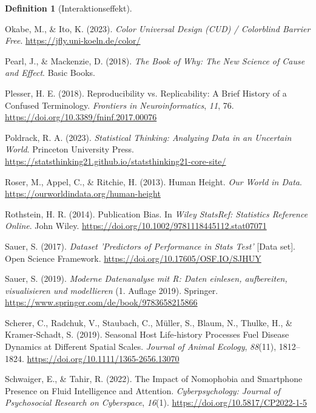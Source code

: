 \documentclass[
  letterpaper,
]{scrbook}
\newlength{\cslhangindent}
\newenvironment{CSLReferences}[2] %
 {\begin{list}{}{%
  \setlength{\itemindent}{0pt}
  \setlength{\leftmargin}{0pt}
  \setlength{\parsep}{0pt}
  \ifodd #1
   \setlength{\leftmargin}{\cslhangindent}
   \setlength{\itemindent}{-1\cslhangindent}
  \fi
  \setlength{\itemsep}{#2\baselineskip}}}
 {\end{list}}
\theoremstyle{definition}
\theoremstyle{definition}
\theoremstyle{definition}
\newtheorem{definition}{Definition}[chapter]
\theoremstyle{remark}
\begin{document}
\begin{definition}[Interaktionseffekt]
\begin{CSLReferences}{1}{0}
Okabe, M., \& Ito, K. (2023). \emph{Color {Universal Design} ({CUD}) /
{Colorblind Barrier Free}}. \url{https://jfly.uni-koeln.de/color/}

Pearl, J., \& Mackenzie, D. (2018). \emph{The Book of Why: The New
Science of Cause and Effect}. Basic Books.

Plesser, H. E. (2018). Reproducibility vs. {Replicability}: {A Brief
History} of a {Confused Terminology}. \emph{Frontiers in
Neuroinformatics}, \emph{11}, 76.
\url{https://doi.org/10.3389/fninf.2017.00076}

Poldrack, R. A. (2023). \emph{Statistical Thinking: Analyzing Data in an
Uncertain World}. Princeton University Press.
\url{https://statsthinking21.github.io/statsthinking21-core-site/}

Roser, M., Appel, C., \& Ritchie, H. (2013). Human Height. \emph{Our
World in Data}. \url{https://ourworldindata.org/human-height}

Rothstein, H. R. (2014). Publication {Bias}. In \emph{Wiley {StatsRef}:
{Statistics Reference Online}}. John Wiley.
\url{https://doi.org/10.1002/9781118445112.stat07071}

Sauer, S. (2017). \emph{Dataset 'Predictors of Performance in Stats
Test'} {[}Data set{]}. Open Science Framework.
\url{https://doi.org/10.17605/OSF.IO/SJHUY}

Sauer, S. (2019). \emph{Moderne Datenanalyse mit R: Daten einlesen,
aufbereiten, visualisieren und modellieren} (1. Auflage 2019). Springer.
\url{https://www.springer.com/de/book/9783658215866}

Scherer, C., Radchuk, V., Staubach, C., Müller, S., Blaum, N., Thulke,
H., \& Kramer‐Schadt, S. (2019). Seasonal Host Life‐history Processes
Fuel Disease Dynamics at Different Spatial Scales. \emph{Journal of
Animal Ecology}, \emph{88}(11), 1812--1824.
\url{https://doi.org/10.1111/1365-2656.13070}

Schwaiger, E., \& Tahir, R. (2022). The Impact of Nomophobia and
Smartphone Presence on Fluid Intelligence and Attention.
\emph{Cyberpsychology: Journal of Psychosocial Research on Cyberspace},
\emph{16}(1). \url{https://doi.org/10.5817/CP2022-1-5}


\end{CSLReferences}
\end{definition}
\end{document}
